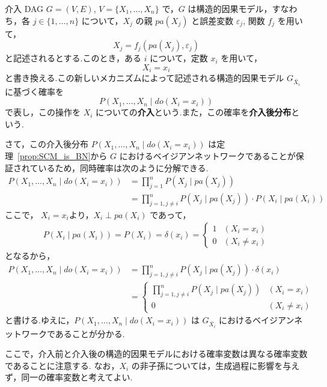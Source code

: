 \documentclass[uplatex, dvipdfmx]{jsarticle}
\begin{document}
\begin{defn}{介入}
  DAG $G=(V,E)$, $V=\{X_1, \dots, X_n\}$ で，$G$ は構造的因果モデル，すなわち，各 $j \in \{1, \dots, n\}$ について，$X_j$ の親 $pa(X_j)$ と誤差変数 $\varepsilon_j$, 関数 $f_j$ を用いて，
  \begin{equation}
    X_j = f_j(pa(X_j), \varepsilon_j)
  \end{equation}
  と記述されるとする.このとき，ある $i$ について，定数 $x_i$ を用いて，
  \begin{equation}
    X_i = x_i
  \end{equation}
  と書き換える.この新しいメカニズムによって記述される構造的因果モデル $G_{\overline{X_i}}$ に基づく確率を
  \[
    P(X_1, \dots, X_n \mid do(X_i = x_i))
  \]
  で表し，この操作を $X_i$ についての\textbf{介入}という.また，この確率を\textbf{介入後分布}という.
\end{defn}

さて，この介入後分布 $P(X_1, \dots, X_n \mid do(X_i = x_i))$ は定理~\ref{prop:SCM_is_BN}から $G$ におけるベイジアンネットワークであることが保証されているため，同時確率は次のように分解できる.
\begin{align*}
  P(X_1, \dots, X_n \mid do(X_i = x_i)) &= \prod_{j=1}^n P(X_j \mid pa(X_j)) \\
  &= \prod_{j=1, j \neq i}^n P(X_j \mid pa(X_j)) \cdot P(X_i \mid pa(X_i))
\end{align*}
ここで，
$X_i = x_i$より，$X_i \perp pa(X_i)$ であって，
\begin{align}
  P(X_i \mid pa(X_i)) = P(X_i) = \delta(x_i) = 
  \begin{cases} 
    1 & (X_i = x_i) \\ 
    0 & (X_i \neq x_i) 
  \end{cases}
\end{align}
となるから，
\begin{align}
  P(X_1, \dots, X_n \mid do(X_i = x_i)) &= \prod_{j=1, j \neq i}^n P(X_j \mid pa(X_j)) \cdot \delta(x_i) \\
  &= 
  \begin{cases} 
    \prod_{j=1, j \neq i}^n P(X_j \mid pa(X_j)) & (X_i = x_i) \\ 
    0 & (X_i \neq x_i) 
  \end{cases}
\end{align}
と書ける.ゆえに，$P(X_1, \dots, X_n \mid do(X_i = x_i))$ は $G_{\overline{X_i}}$ におけるベイジアンネットワークであることが分かる.

ここで，介入前と介入後の構造的因果モデルにおける確率変数は異なる確率変数であることに注意する.
なお，$X_i$ の非子孫については，生成過程に影響を与えず，同一の確率変数と考えてよい.
\end{document}
